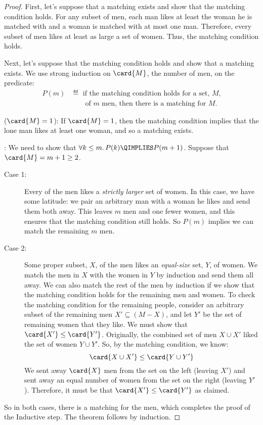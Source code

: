 \begin{proof}
  First, let's suppose that a matching exists and show that the matching
  condition holds.  For any subset of men, each man likes at least the
  woman he is matched with and a woman is matched with at most one man.
  Therefore, every subset of men likes at least as large a set of women.
  Thus, the matching condition holds.

Next, let's suppose that the matching condition holds and show that a
matching exists.  We use strong induction on $\card{M}$, the number of
men, on the predicate:
\begin{align*}
    P(m) & \eqdef \text{ if the matching condition holds for a set,~$M$,}\\
         &\qquad  \text{of~$m$ men, then there is a matching for~$M$.}
\end{align*}

 ($\card{M}=1$): If $\card{M} = 1$, then the
matching condition implies that the lone man likes at least one woman,
and so a matching exists.

: We need to show that $\forall k \le m.\, P(k) \QIMPLIES
P(m + 1)$.  Suppose that $\card{M} = m + 1 \ge 2$.
\begin{description}

\item[Case 1:] Every  of the men likes a
  \emph{strictly larger} set of women.  In this case, we have some
  latitude: we pair an arbitrary man with a woman he likes and send
  them both away.  This leaves $m$ men and one fewer women, and this
  ensures that the matching condition still holds.  So $P(m)$ implies
  we can match the remaining $m$ men.

\item[Case 2:] Some proper subset, $X$, of the men likes an
  \emph{equal-size} set, $Y$, of women.  We match the men in $X$ with
  the women in $Y$ by induction and send them all away.  We can also
  match the rest of the men by induction if we show that the matching
  condition holds for the remaining men and women.  To check the
  matching condition for the remaining people, consider an arbitrary
  subset of the remaining men $X' \subseteq (M - X)$, and let $Y'$ be
  the set of remaining women that they like.  We must show that
  $\card{X'} \leq \card{Y'}$.  Originally, the combined set of men $X
  \cup X'$ liked the set of women $Y \cup Y'$.  So, by the matching
  condition, we know:
%
  \begin{equation*}
  \card{X \cup X'}  \leq  \card{Y \cup Y'}
  \end{equation*}
%
  We sent away $\card{X}$ men from the set on the left (leaving $X'$)
  and sent away an equal number of women from the set on the right
  (leaving $Y'$).  Therefore, it must be that $\card{X'} \leq
  \card{Y'}$ as claimed.
\end{description}

So in both cases, there is a matching for the men, which completes the
proof of the Inductive step.  The theorem follows by induction.
\end{proof}

